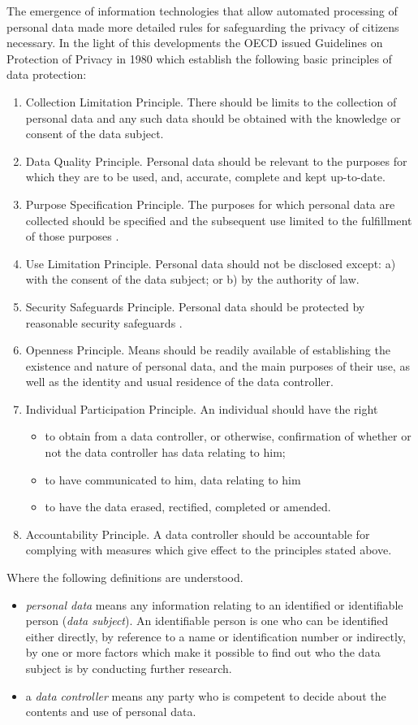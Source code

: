 The emergence of information technologies that allow automated processing of personal data made more detailed rules for safeguarding the privacy of citizens necessary.
In the light of this developments the OECD  \cite{OECD80} issued Guidelines on Protection of Privacy in 1980 which establish the following basic principles of data protection:
\begin{enumerate}
\item Collection Limitation Principle.
  There should be limits to the collection of personal data and any such data should be obtained \om with the knowledge or consent of the data subject.
\item Data Quality Principle.
  Personal data should be relevant to the purposes for which they are to be used, and,  \om accurate, complete and kept up-to-date.
\item Purpose Specification Principle.
  The purposes for which personal data are collected should be specified \om and the subsequent use limited to the fulfillment of those purposes \om.
\item Use Limitation Principle.
  Personal data should not be disclosed \om except: a) with the consent of the data subject; or b) by the authority of law.
\item Security Safeguards Principle.
  Personal data should be protected by reasonable security safeguards \om.
\item Openness Principle.
  {\om} Means should be readily available of establishing the existence and nature of personal data, and the main purposes of their use, as well as the identity and usual residence of the data controller.
\item Individual Participation Principle.
  An individual should have the right
  \begin{itemize}
  \item to obtain from a data controller, or otherwise, confirmation of whether or not the data controller has data relating to him;
  \item to have communicated to him, data relating to him \om
  \item \om to have the data erased, rectified, completed or amended.
  \end{itemize}
\item Accountability Principle.
  A data controller should be accountable for complying with measures which give effect to the principles stated above.
\end{enumerate}

Where the following definitions are understood.
\begin{itemize}
\item \emph{personal data} means any information relating to an identified or identifiable person (\emph{data subject}).
  An identifiable person is one who can be identified either directly, by reference to a name or identification number or indirectly, by one or more factors which make it possible to find out who the data subject is by conducting further research.
\item a \emph{data controller} means any party who is competent to decide about the contents and use of personal data.
\end{itemize}

